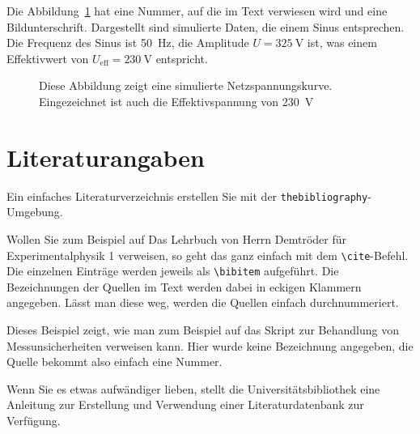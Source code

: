 \documentclass[11pt,a4paper]{article}
\begin{document}
Die Abbildung~\ref{fig:eineAbbildung} hat eine Nummer, auf die im Text verwiesen wird und eine Bildunterschrift. Dargestellt sind simulierte Daten, die einem Sinus entsprechen. Die Frequenz des Sinus ist 50~Hz, die Amplitude $U=325\ \mathrm{V}$ ist, was einem Effektivwert von $U_\mathrm{eff} = 230\ \mathrm{V}$ entspricht.
\begin{figure}[b]
    \centering
    \caption{Diese Abbildung zeigt eine simulierte Netzspannungskurve. Eingezeichnet ist auch die Effektivspannung von 230~V}
    \label{fig:eineAbbildung}
\end{figure}

\section{Literaturangaben}
Ein einfaches Literaturverzeichnis erstellen Sie mit der \verb!thebibliography!-Umgebung.

Wollen Sie zum Beispiel auf Das Lehrbuch von Herrn Demtröder für Experimentalphysik 1\cite{demtr1} verweisen, so geht das ganz einfach mit dem \verb!\cite!-Befehl. Die einzelnen Einträge werden jeweils als \verb!\bibitem! aufgeführt. Die Bezeichnungen der Quellen im Text werden dabei in eckigen Klammern angegeben. Lässt man diese weg, werden die Quellen einfach durchnummeriert.

Dieses Beispiel zeigt, wie man zum Beispiel auf das Skript zur Behandlung von Messunsicherheiten\cite{ABW} verweisen kann. Hier wurde keine Bezeichnung angegeben, die Quelle bekommt also einfach eine Nummer.

Wenn Sie es etwas aufwändiger lieben, stellt die Universitätsbibliothek eine Anleitung zur Erstellung und Verwendung einer Literaturdatenbank\cite{mediatum} zur Verfügung. 

\begin{thebibliography}{Ddddd} %


\end{thebibliography}
\end{document}
